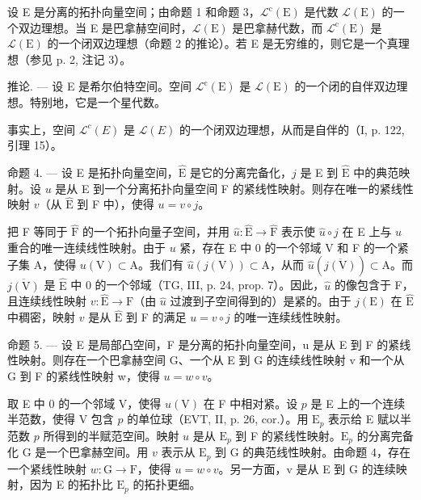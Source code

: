 设 E 是分离的拓扑向量空间；由命题 1 和命题 3，\(\mathcal{L}^{\mathrm{c}}(\mathrm{E})\) 是代数 \(\mathcal{L}(\mathrm{E})\) 的一个双边理想。当 E 是巴拿赫空间时，\(\mathcal{L}(\mathrm{E})\) 是巴拿赫代数，而 \(\mathcal{L}^{\mathrm{c}}(\mathrm{E})\) 是 \(\mathcal{L}(\mathrm{E})\) 的一个闭双边理想（命题 2 的推论）。若 E 是无穷维的，则它是一个真理想（参见 p. 2, 注记 3）。

推论. — 设 E 是希尔伯特空间。空间 \(\mathcal{L}^{\mathrm{c}}(\mathrm{E})\) 是 \(\mathcal{L}(\mathrm{E})\) 的一个闭的自伴双边理想。特别地，它是一个星代数。

事实上，空间 \(\mathcal{L}^{c}(E)\) 是 \(\mathcal{L}(E)\) 的一个闭双边理想，从而是自伴的（I, p. 122, 引理 15）。

命题 4. — 设 E 是拓扑向量空间，\(\widehat{\mathrm{E}}\) 是它的分离完备化，\(j\) 是 E 到 \(\widehat{\mathrm{E}}\) 中的典范映射。设 \(u\) 是从 E 到一个分离拓扑向量空间 F 的紧线性映射。则存在唯一的紧线性映射 \(v\)（从 \(\widehat{\mathrm{E}}\) 到 F 中），使得 \(u = v \circ j\)。

把 F 等同于 \(\widehat{\mathrm{F}}\) 的一个拓扑向量子空间，并用 \(\widehat{u}\colon \widehat{\mathrm{E}}\to \widehat{\mathrm{F}}\) 表示使 \(\widehat{u}\circ j\) 在 E 上与 \(u\) 重合的唯一连续线性映射。由于 \(u\) 紧，存在 E 中 0 的一个邻域 V 和 F 的一个紧子集 A，使得 \(u(\mathrm{V})\subset \mathrm{A}\)。我们有 \(\widehat{u}(j(\mathrm{V}))\subset \mathrm{A}\)，从而 \(\widehat{u} (\overline{j(\mathrm{V})})\subset \mathrm{A}\)。而 \(\overline{j(\mathrm{V})}\) 是 \(\widehat{\mathrm{E}}\) 中 0 的一个邻域（TG, III, p. 24, prop. 7）。因此，\(\widehat{u}\) 的像包含于 F，且连续线性映射 \(v\colon \widehat{\mathrm{E}}\rightarrow \mathrm{F}\)（由 \(\widehat{u}\) 过渡到子空间得到的）是紧的。由于 \(j(\mathrm{E})\) 在 \(\widehat{\mathrm{E}}\) 中稠密，映射 \(v\) 是从 \(\widehat{\mathrm{E}}\) 到 F 的满足 \(u = v\circ j\) 的唯一连续线性映射。

命题 5. --- 设 E 是局部凸空间，F 是分离的拓扑向量空间，u 是从 E 到 F 的紧线性映射。则存在一个巴拿赫空间 G、一个从 E 到 G 的连续线性映射 v 和一个从 G 到 F 的紧线性映射 w，使得 \(u = w \circ v\)。

取 E 中 0 的一个邻域 V，使得 \(u(\mathrm{V})\) 在 F 中相对紧。设 \(p\) 是 E 上的一个连续半范数，使得 V 包含 \(p\) 的单位球（EVT, II, p. 26, cor.）。用 \(\mathrm{E}_p\) 表示给 E 赋以半范数 \(p\) 所得到的半赋范空间。映射 \(u\) 是从 \(\mathrm{E}_p\) 到 F 的紧线性映射。\(\mathrm{E}_p\) 的分离完备化 G 是一个巴拿赫空间。用 \(v\) 表示从 \(\mathrm{E}_p\) 到 G 的典范线性映射。由命题 4，存在一个紧线性映射 \(w: \mathrm{G} \to \mathrm{F}\)，使得 \(u = w \circ v\)。另一方面，v 是从 E 到 G 的连续映射，因为 E 的拓扑比 \(\mathrm{E}_p\) 的拓扑更细。

